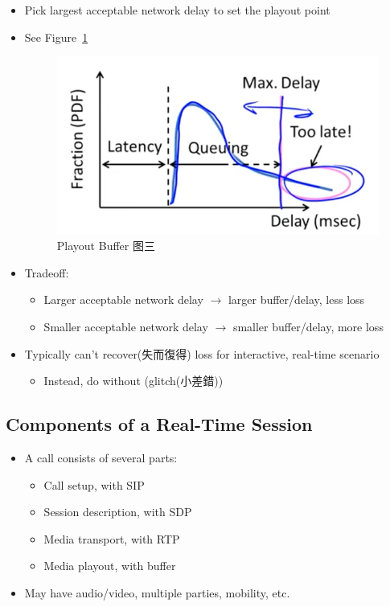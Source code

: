 \documentclass[12pt]{ctexart}   %
\begin{document}
\begin{itemize}
		 \item Pick largest acceptable network delay to set the playout point
		 \item See Figure~\ref{fig:9-2-8}
		  
		 \begin{figure}[h!] %
		\centering
		 \includegraphics[scale=0.7]{images/9-2-8}
		\caption{ Playout Buffer 图三 }
		 \label{fig:9-2-8}
		 \end{figure}
		 
		 \item Tradeoff:
		 \begin{itemize}
		 	\item Larger acceptable network delay   $\rightarrow$   larger buffer/delay, less loss
		 	\item Smaller acceptable network delay  $\rightarrow$  smaller buffer/delay, more loss
		 \end{itemize}
		 
		 \item Typically can't recover(失而復得) loss for interactive, real-time scenario
		 \begin{itemize}
		 	\item Instead, do without (glitch(小差錯))
		 \end{itemize}
	\end{itemize}
	
	\subsection{Components of a Real-Time Session}
	\begin{itemize}
		\item A call consists of several parts:
		\begin{itemize}
			\item Call setup, with SIP
			\item Session description, with SDP
			\item Media transport, with RTP
			\item Media playout, with buffer
		\end{itemize}
		
		\item May have audio/video, multiple parties, mobility, etc.
	\end{itemize}
	
\end{document}
